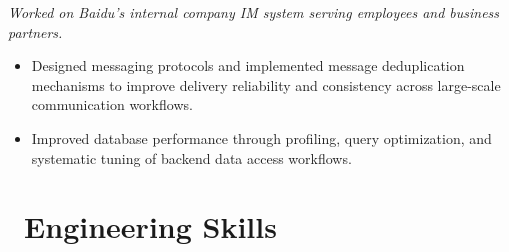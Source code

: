\documentclass{resume}
\begin{document}


\textit{Worked on Baidu's internal company IM system serving employees and business partners.}
\begin{itemize}[parsep=0.4ex]

\item Designed messaging protocols and implemented message deduplication mechanisms to improve delivery reliability and consistency across large-scale communication workflows.


\item Improved database performance through profiling, query optimization, and systematic tuning of backend data access workflows.

\end{itemize}


\section{\faCogs\ \textbf{Engineering Skills}}
\end{document}
